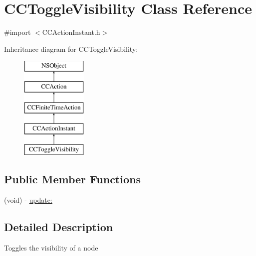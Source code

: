 \hypertarget{interface_c_c_toggle_visibility}{\section{C\-C\-Toggle\-Visibility Class Reference}
\label{interface_c_c_toggle_visibility}
}


{\ttfamily \#import $<$C\-C\-Action\-Instant.\-h$>$}

Inheritance diagram for C\-C\-Toggle\-Visibility\-:\begin{figure}[H]
\begin{center}
\leavevmode
\includegraphics[height=5.000000cm]{interface_c_c_toggle_visibility}
\end{center}
\end{figure}
\subsection*{Public Member Functions}
\begin{DoxyCompactItemize}
\item 
(void) -\/ \hyperlink{interface_c_c_toggle_visibility_ab70b05c8c66c0393919395aeb8e1a157}{update\-:}
\end{DoxyCompactItemize}


\subsection{Detailed Description}
Toggles the visibility of a node 

